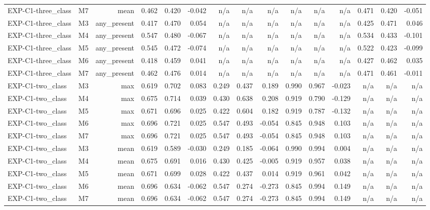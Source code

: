 \begin{table}[htbp]
\begin{tabular}{lrrrrrrrrrrrrrr}
    EXP-C1-three\_class & M7 & mean & 0.462 & 0.420 & -0.042 & n/a & n/a & n/a & n/a & n/a & n/a & 0.471 & 0.420 & -0.051 \\
    EXP-C1-three\_class & M3 & any\_present & 0.417 & 0.470 & 0.054 & n/a & n/a & n/a & n/a & n/a & n/a & 0.425 & 0.471 & 0.046 \\
    EXP-C1-three\_class & M4 & any\_present & 0.547 & 0.480 & -0.067 & n/a & n/a & n/a & n/a & n/a & n/a & 0.534 & 0.433 & -0.101 \\
    EXP-C1-three\_class & M5 & any\_present & 0.545 & 0.472 & -0.074 & n/a & n/a & n/a & n/a & n/a & n/a & 0.522 & 0.423 & -0.099 \\
    EXP-C1-three\_class & M6 & any\_present & 0.418 & 0.459 & 0.041 & n/a & n/a & n/a & n/a & n/a & n/a & 0.427 & 0.462 & 0.035 \\
    EXP-C1-three\_class & M7 & any\_present & 0.462 & 0.476 & 0.014 & n/a & n/a & n/a & n/a & n/a & n/a & 0.471 & 0.461 & -0.011 \\
    EXP-C1-two\_class & M3 & max & 0.619 & 0.702 & 0.083 & 0.249 & 0.437 & 0.189 & 0.990 & 0.967 & -0.023 & n/a & n/a & n/a \\
    EXP-C1-two\_class & M4 & max & 0.675 & 0.714 & 0.039 & 0.430 & 0.638 & 0.208 & 0.919 & 0.790 & -0.129 & n/a & n/a & n/a \\
    EXP-C1-two\_class & M5 & max & 0.671 & 0.696 & 0.025 & 0.422 & 0.604 & 0.182 & 0.919 & 0.787 & -0.132 & n/a & n/a & n/a \\
    EXP-C1-two\_class & M6 & max & 0.696 & 0.721 & 0.025 & 0.547 & 0.493 & -0.054 & 0.845 & 0.948 & 0.103 & n/a & n/a & n/a \\
    EXP-C1-two\_class & M7 & max & 0.696 & 0.721 & 0.025 & 0.547 & 0.493 & -0.054 & 0.845 & 0.948 & 0.103 & n/a & n/a & n/a \\
    EXP-C1-two\_class & M3 & mean & 0.619 & 0.589 & -0.030 & 0.249 & 0.185 & -0.064 & 0.990 & 0.994 & 0.004 & n/a & n/a & n/a \\
    EXP-C1-two\_class & M4 & mean & 0.675 & 0.691 & 0.016 & 0.430 & 0.425 & -0.005 & 0.919 & 0.957 & 0.038 & n/a & n/a & n/a \\
    EXP-C1-two\_class & M5 & mean & 0.671 & 0.699 & 0.028 & 0.422 & 0.437 & 0.014 & 0.919 & 0.961 & 0.042 & n/a & n/a & n/a \\
    EXP-C1-two\_class & M6 & mean & 0.696 & 0.634 & -0.062 & 0.547 & 0.274 & -0.273 & 0.845 & 0.994 & 0.149 & n/a & n/a & n/a \\
    EXP-C1-two\_class & M7 & mean & 0.696 & 0.634 & -0.062 & 0.547 & 0.274 & -0.273 & 0.845 & 0.994 & 0.149 & n/a & n/a & n/a \\

\end{tabular}
\end{table}
